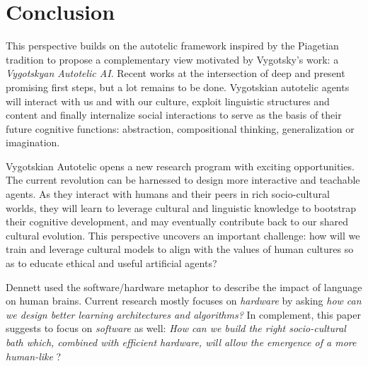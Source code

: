 \section*{Conclusion}

This perspective builds on the autotelic \rl framework inspired by the Piagetian tradition to propose a complementary view motivated by Vygotsky's work: a \textit{Vygotskyan Autotelic AI}. Recent works at the intersection of deep \rl and \nlp present promising first steps, but a lot remains to be done. Vygotskian autotelic agents will interact with us and with our culture, exploit linguistic structures and content and finally internalize social interactions to serve as the basis of their future cognitive functions: abstraction, compositional thinking, generalization or imagination. 

Vygotskian Autotelic \ai opens a new research program with exciting opportunities. The current \nlp revolution can be harnessed to design more interactive and teachable agents. As they interact with humans and their peers in rich socio-cultural worlds, they will learn to leverage cultural and linguistic knowledge to bootstrap their cognitive development, and may eventually contribute back to our shared cultural evolution. This perspective uncovers an important challenge: how will we train and leverage cultural models to align with the values of human cultures so as to educate ethical and useful artificial agents?

Dennett used the software/hardware metaphor to describe the impact of language on human brains.\cite{dennett_consciousness_1993} Current \ai research mostly focuses on \textit{hardware} by asking \textit{how can we design better learning architectures and algorithms?} In complement, this paper suggests to focus on \textit{software} as well: \textit{How can we build the right socio-cultural bath which, combined with efficient hardware, will allow the emergence of a more human-like \ai}?



